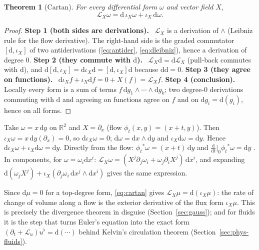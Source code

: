 \documentclass[11pt,a4paper]{article}
\newcounter{thm}[section]
\numberwithin{equation}{section}
\theoremstyle{definition}
\theoremstyle{plain}
\newtheorem{theorem}[thm]{Theorem}
\newcommand{\Step}[2]{\textbf{Step #1 (#2).}\ }
\newcommand{\R}{\mathbb{R}}
\newcommand{\dd}{\mathrm{d}}
\newcommand{\Lie}{\mathcal{L}}
\newcommand{\pb}{{}^{*}}                            %
\begin{document}
\begin{theorem}[Cartan]\label{thm:cartan}
For every differential form $\omega$ and vector field $X$,
\begin{equation}\label{eq:cartan}
\Lie_X\omega=\dd\,\iota_X\omega+\iota_X\,\dd\omega .
\end{equation}
\end{theorem}
\begin{proof}
\Step{1}{both sides are derivations} $\Lie_X$ is a derivation of $\wedge$ (Leibniz rule for the flow derivative). The right-hand side is the graded commutator $[\dd,\iota_X]$ of two antiderivations (\eqref{eq:antider}, \eqref{eq:dleibniz}), hence a derivation of degree $0$.
\Step{2}{they commute with $\dd$} $\Lie_X\dd=\dd\Lie_X$ (pull-back commutes with $\dd$), and $\dd[\dd,\iota_X]=\dd\iota_X\dd=[\dd,\iota_X]\dd$ because $\dd\dd=0$.
\Step{3}{they agree on functions} $\dd\iota_Xf+\iota_X\dd f=0+X(f)=\Lie_Xf$.
\Step{4}{conclusion} Locally every form is a sum of terms $f\,\dd g_1\wedge\cdots\wedge\dd g_k$; two degree-$0$ derivations commuting with $\dd$ and agreeing on functions agree on $f$ and on $\dd g_i=\dd(g_i)$, hence on all forms.
\end{proof}

\begin{example}\label{ex:cartan1}
Take $\omega=x\,\dd y$ on $\R^2$ and $X=\partial_x$ (flow $\phi_t(x,y)=(x+t,y)$). Then $\iota_X\omega=x\,\dd y(\partial_x)=0$, so $\dd\iota_X\omega=0$; $\dd\omega=\dd x\wedge\dd y$ and $\iota_X\dd\omega=\dd y$. Hence $\dd\iota_X\omega+\iota_X\dd\omega=\dd y$.
Directly from the flow: $\phi_t\pb\omega=(x+t)\,\dd y$ and $\frac{\dd}{\dd t}\big|_0\phi_t\pb\omega=\dd y$ \checkmark.
In components, for $\omega=\omega_i\dd x^i$: $\Lie_X\omega=(X^j\partial_j\omega_i+\omega_j\partial_iX^j)\,\dd x^i$, and expanding $\dd(\omega_jX^j)+\iota_X(\partial_j\omega_i\,\dd x^j\wedge\dd x^i)$ gives the same expression.
\end{example}

\begin{remark}
Since $\dd\mu=0$ for a top-degree form, \eqref{eq:cartan} gives $\Lie_X\mu=\dd(\iota_X\mu)$: the rate of change of volume along a flow is the exterior derivative of the flux form $\iota_X\mu$. This is precisely the divergence theorem in disguise (Section~\ref{sec:gauss}); and for fluids it is the step that turns Euler's equation into the exact form $(\partial_t+\Lie_u)u^\flat=\dd(\cdots)$ behind Kelvin's circulation theorem (Section~\ref{sec:phys-fluids}).
\end{remark}
\end{document}
